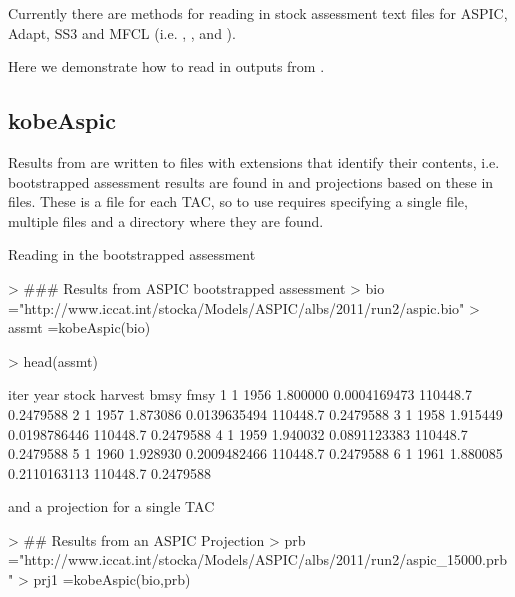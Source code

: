 \documentclass[shortnames,nojss,article]{jss}
\begin{document}
Currently there are methods for reading in stock assessment text files for ASPIC, Adapt, SS3 and MFCL (i.e. , , 
 and ). 

Here we demonstrate how to read in outputs from .

\subsection{kobeAspic}

Results from  are written to files with extensions that identify their contents, i.e.
bootstrapped assessment results are found in  and projections based on these in  files. 
These is a  file for each TAC, so to use  requires 
specifying a single  file, multiple  files and a directory where they are found. 

Reading in the bootstrapped assessment

\begin{Schunk}
\begin{Sinput}
> ### Results from ASPIC bootstrapped assessment
> bio   ="http://www.iccat.int/stocka/Models/ASPIC/albs/2011/run2/aspic.bio"
> assmt =kobeAspic(bio)
\end{Sinput}
\end{Schunk}
\begin{Schunk}
\begin{Sinput}
> head(assmt)
\end{Sinput}
\begin{Soutput}
  iter year    stock      harvest     bmsy      fmsy
1    1 1956 1.800000 0.0004169473 110448.7 0.2479588
2    1 1957 1.873086 0.0139635494 110448.7 0.2479588
3    1 1958 1.915449 0.0198786446 110448.7 0.2479588
4    1 1959 1.940032 0.0891123383 110448.7 0.2479588
5    1 1960 1.928930 0.2009482466 110448.7 0.2479588
6    1 1961 1.880085 0.2110163113 110448.7 0.2479588
\end{Soutput}
\end{Schunk}

and a projection for a single TAC 

\begin{Schunk}
\begin{Sinput}
> ## Results from an ASPIC Projection
> prb  ="http://www.iccat.int/stocka/Models/ASPIC/albs/2011/run2/aspic_15000.prb"
> prj1 =kobeAspic(bio,prb)
\end{Sinput}
\end{Schunk}
\end{document}
